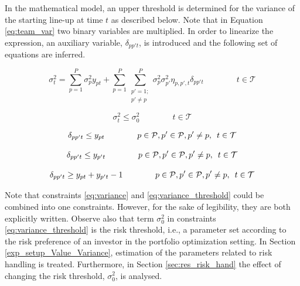 \newpar

In the mathematical model, an upper threshold is determined for the variance of the starting line-up at time $t$ as described below. Note that in Equation \ref{eq:team_var} two binary variables are multiplied. In order to linearize the expression, an auxiliary variable, $\delta_{pp't}$, is introduced and the following set of equations are inferred.

\begin{equation} \label{eq:variance}
    \sigma^2_{t} = \sum_{p = 1}^{P}\sigma_p^2 y_{pt} + \sum_{p = 1}^{P}\sum_{\substack{p' = 1; \\ p' \neq p}}^{P} \sigma_p^2\sigma_{p'}^2\eta_{p,p',t} \delta_{pp't} \qquad\qquad t \in \mathcal{T}
\end{equation}

\begin{equation} \label{eq:variance_threshold}
    \sigma^2_{t} \leq \sigma_{0}^2 \qquad\qquad t \in \mathcal{T}
\end{equation}

\begin{equation} \label{eq:variance_p_beta}
    \delta_{pp't} \leq y_{pt}  \qquad\qquad p \in \mathcal{P}, p' \in \mathcal{P}, p' \neq p, \enskip t \in \mathcal{T}
\end{equation}

\begin{equation} \label{eq:variance_p_dash_beta}
    \delta_{pp't} \leq y_{p't}  \qquad\qquad p \in \mathcal{P}, p' \in \mathcal{P}, p' \neq p, \enskip t \in \mathcal{T}
\end{equation}

\begin{equation} \label{eq:variance_p_p_dash_beta}
    \delta_{pp't} \geq y_{pt} + y_{p't} - 1  \qquad\qquad p \in \mathcal{P}, p' \in \mathcal{P}, p' \neq p, \enskip t \in \mathcal{T}
\end{equation}

Note that constraints \eqref{eq:variance} and \eqref{eq:variance_threshold} could be combined into one constraints. However, for the sake of legibility, they are both explicitly written. Observe also that term $\sigma_{0}^2$ in constraints \eqref{eq:variance_threshold} is the risk threshold, i.e., a parameter set according to the risk preference of an investor in the portfolio optimization setting. In Section \ref{exp_setup_Value_Variance}, estimation of the parameters related to risk handling is treated. Furthermore, in Section \ref{sec:res_risk_hand} the effect of changing the risk threshold, $\sigma_{0}^2$, is analysed.



